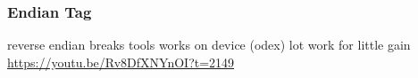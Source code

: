 \subsubsection{Endian Tag}\label{subsubsection:counter-reengineering-break-endian}
reverse endian\newline
breaks tools works on device (odex)\newline
lot work for little gain\newline
\url{https://youtu.be/Rv8DfXNYnOI?t=2149}
